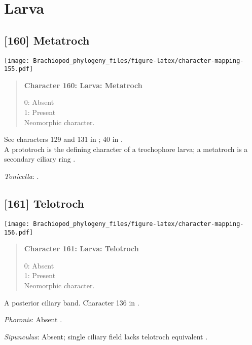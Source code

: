 \documentclass[openany]{book}
\theoremstyle{definition}
\theoremstyle{definition}
\theoremstyle{definition}
\theoremstyle{remark}
\begin{document}
\section{Larva}\label{larva}

\subsection*{{[}160{]} Metatroch}\label{metatroch}

\texttt{[image: Brachiopod\_phylogeny\_files/figure-latex/character-mapping-155.pdf]}

\begin{quote}
\textbf{Character 160: Larva: Metatroch}

0: Absent\\
1: Present\\
Neomorphic character.
\end{quote}

See characters 129 and 131 in \citet{Rouse1999}; 40 in
\citet{Haszprunar1996}.\\
A prototroch is the defining character of a trochophore larva; a
metatroch is a secondary ciliary ring \citep{Rouse1999}.

\hypertarget{Tonicella-coding-160}{}
\emph{Tonicella}: \citet{Williams1997Introduction}.

\subsection*{{[}161{]} Telotroch}\label{telotroch}

\texttt{[image: Brachiopod\_phylogeny\_files/figure-latex/character-mapping-156.pdf]}

\begin{quote}
\textbf{Character 161: Larva: Telotroch}

0: Absent\\
1: Present\\
Neomorphic character.
\end{quote}

A posterior ciliary band. Character 136 in \citet{Rouse1999}.

\hypertarget{Phoronis-coding-161}{}
\emph{Phoronis}: Absent \citep{Zimmer2013}.

\hypertarget{Sipunculus-coding-161}{}
\emph{Sipunculus}: Absent; single ciliary field lacks telotroch
equivalent \citep{Reed1982}.
\end{document}

